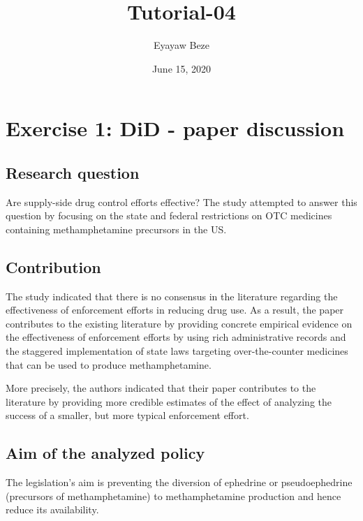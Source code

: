 \documentclass[
  11pt,
]{article}
\title{Tutorial-04}
\author{Eyayaw Beze}
\date{June 15, 2020}
\begin{document}
\maketitle

\hypertarget{exercise-1-did---paper-discussion}{%
\section{Exercise 1: DiD - paper
discussion}\label{exercise-1-did---paper-discussion}}

\hypertarget{research-question}{%
\subsection*{Research question}\label{research-question}}

Are supply-side drug control efforts effective? The study attempted to
answer this question by focusing on the state and federal restrictions
on OTC medicines containing methamphetamine precursors in the US.

\hypertarget{contribution}{%
\subsection*{Contribution}\label{contribution}}

The study indicated that there is no consensus in the literature
regarding the effectiveness of enforcement efforts in reducing drug use.
As a result, the paper contributes to the existing literature by
providing concrete empirical evidence on the effectiveness of
enforcement efforts by using rich administrative records and the
staggered implementation of state laws targeting over-the-counter
medicines that can be used to produce methamphetamine.

More precisely, the authors indicated that their paper contributes to
the literature by providing more credible estimates of the effect of
analyzing the success of a smaller, but more typical enforcement effort.

\hypertarget{aim-of-the-analyzed-policy}{%
\subsection*{Aim of the analyzed
policy}\label{aim-of-the-analyzed-policy}}

The legislation's aim is preventing the diversion of ephedrine or
pseudoephedrine (precursors of methamphetamine) to methamphetamine
production and hence reduce its availability.
\end{document}
